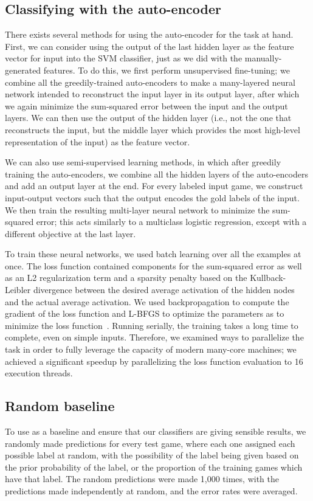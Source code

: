 \documentclass[11pt]{article}
\begin{document}
\subsection{Classifying with the auto-encoder}
\label{sec:classifying-auto-encoder}
There exists several methods for using the auto-encoder for the task at 
hand. First, we can consider using the output of the last hidden layer 
as the feature vector for input into the SVM classifier, just as we did 
with the manually-generated features. To do this, we first perform 
unsupervised fine-tuning; we combine all the greedily-trained 
auto-encoders to make a many-layered neural network intended to 
reconstruct the input layer in its output layer, after which we again 
minimize the sum-squared error between the input and the output layers. 
We can then use the output of the hidden layer (i.e., not the one that 
reconstructs the input, but the middle layer which provides the most 
high-level representation of the input) as the feature vector.

We can also use semi-supervised learning methods, in which after 
greedily training the auto-encoders, we combine all the hidden layers of 
the auto-encoders and add an output layer at the end. For every labeled 
input game, we construct input-output vectors such that the output 
encodes the gold labels of the input. We then train the resulting 
multi-layer neural network to minimize the sum-squared error; this acts 
similarly to a multiclass logistic regression, except with a different 
objective at the last layer.

To train these neural networks, we used batch learning over all the 
examples at once. The loss function contained components for the 
sum-squared error as well as an L2 regularization term and a sparsity 
penalty based on the Kullback-Leibler divergence between the desired 
average activation of the hidden nodes and the actual average 
activation. We used backpropagation to compute the gradient of the loss 
function and L-BFGS to optimize the parameters as to minimize the loss 
function~\cite{ng-lecturenotes}. Running serially, the training takes a 
long time to complete, even on simple inputs. Therefore, we examined 
ways to parallelize the task in order to fully leverage the capacity of 
modern many-core machines; we achieved a significant speedup by 
parallelizing the loss function evaluation to 16 execution threads.

\subsection{Random baseline}
To use as a baseline and ensure that our classifiers are giving sensible 
results, we randomly made predictions for every test game, where each 
one assigned each possible label at random, with the possibility of the 
label being given based on the prior probability of the label, or the 
proportion of the training games which have that label. The random 
predictions were made 1,000 times, with the predictions made 
independently at random, and the error rates were averaged.
\end{document}
